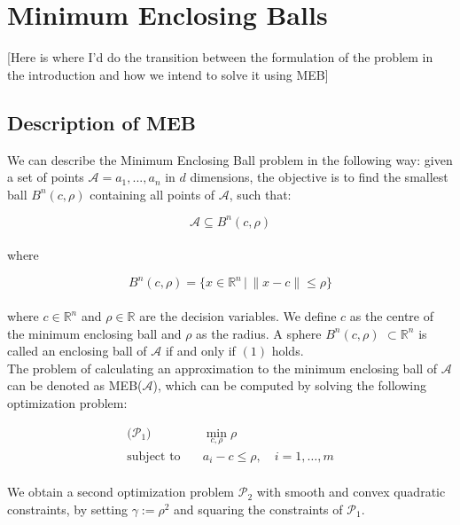 \documentclass[12pt,a4paper]{article}
\begin{document}
\section{Minimum Enclosing Balls}

[Here is where I'd do the transition between the formulation of the problem in the introduction and how we intend to solve it using MEB]

\subsection{Description of MEB}

We can describe the Minimum Enclosing Ball problem in the following way: given a set of points \(\mathcal{A} = a_1, ..., a_n\) in \(d\) dimensions, the objective is to find the smallest ball \(B^n(c, \rho) \) containing all points of $\mathcal{A}$, such that:

\begin{equation}
\mathcal{A} \subseteq B^n(c, \rho)
\end{equation}\\
where

\begin{equation}
B^n(c, \rho) = \{x \in \mathbb{R}^n \, | \, \|x - c\| \leq \rho\}
\end{equation}\\
where \( c \in \mathbb{R}^n \) and \( \rho \in \mathbb{R} \) are the decision variables. We define \( c \) as the centre of the minimum enclosing ball and \( \rho \) as the radius. A sphere \(B^n(c, \rho)\) \(\subset \mathbb{R}^n\) is called an enclosing ball of \(\mathcal{A} \) if and only if \((1)\) holds.
\\

The problem of calculating an approximation to the minimum enclosing ball  of $\mathcal{A}$ can be denoted as MEB($\mathcal{A}$), which can be computed by solving the following optimization problem:

\begin{align*}
\text{($\mathcal{P}_1$)} \quad & \min_{c, \rho} \rho \\
\text{subject to} \quad & a_i - c \leq \rho, \quad i = 1, \ldots, m\\
\end{align*}

We obtain a second optimization problem $\mathcal{P}_2$ with smooth and convex quadratic constraints, by setting \(\gamma := \rho^2 \) and squaring the constraints of $\mathcal{P}_1$.
\end{document}
